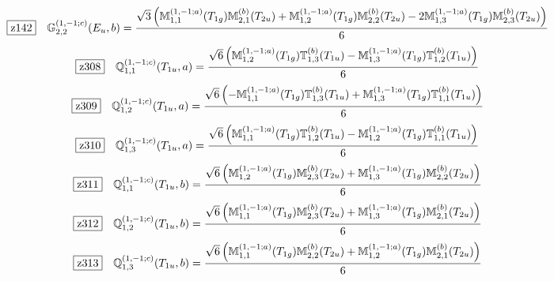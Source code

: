 \documentclass[fleqn,10pt,landscape]{jsarticle}
\begin{document}
\begin{dmath*}
\hspace*{3mm}\fbox{z142}\quad \mathbb{G}_{2,2}^{(1,-1;c)}(E_{u},b)=\frac{\sqrt{3} \left(\mathbb{M}_{1,1}^{(1,-1;a)}(T_{1g}) \mathbb{M}_{2,1}^{(b)}(T_{2u}) + \mathbb{M}_{1,2}^{(1,-1;a)}(T_{1g}) \mathbb{M}_{2,2}^{(b)}(T_{2u}) - 2 \mathbb{M}_{1,3}^{(1,-1;a)}(T_{1g}) \mathbb{M}_{2,3}^{(b)}(T_{2u})\right)}{6}
\end{dmath*}
\begin{dmath*}
\hspace*{3mm}\fbox{z308}\quad \mathbb{Q}_{1,1}^{(1,-1;c)}(T_{1u},a)=\frac{\sqrt{6} \left(\mathbb{M}_{1,2}^{(1,-1;a)}(T_{1g}) \mathbb{T}_{1,3}^{(b)}(T_{1u}) - \mathbb{M}_{1,3}^{(1,-1;a)}(T_{1g}) \mathbb{T}_{1,2}^{(b)}(T_{1u})\right)}{6}
\end{dmath*}
\begin{dmath*}
\hspace*{3mm}\fbox{z309}\quad \mathbb{Q}_{1,2}^{(1,-1;c)}(T_{1u},a)=\frac{\sqrt{6} \left(- \mathbb{M}_{1,1}^{(1,-1;a)}(T_{1g}) \mathbb{T}_{1,3}^{(b)}(T_{1u}) + \mathbb{M}_{1,3}^{(1,-1;a)}(T_{1g}) \mathbb{T}_{1,1}^{(b)}(T_{1u})\right)}{6}
\end{dmath*}
\begin{dmath*}
\hspace*{3mm}\fbox{z310}\quad \mathbb{Q}_{1,3}^{(1,-1;c)}(T_{1u},a)=\frac{\sqrt{6} \left(\mathbb{M}_{1,1}^{(1,-1;a)}(T_{1g}) \mathbb{T}_{1,2}^{(b)}(T_{1u}) - \mathbb{M}_{1,2}^{(1,-1;a)}(T_{1g}) \mathbb{T}_{1,1}^{(b)}(T_{1u})\right)}{6}
\end{dmath*}
\begin{dmath*}
\hspace*{3mm}\fbox{z311}\quad \mathbb{Q}_{1,1}^{(1,-1;c)}(T_{1u},b)=\frac{\sqrt{6} \left(\mathbb{M}_{1,2}^{(1,-1;a)}(T_{1g}) \mathbb{M}_{2,3}^{(b)}(T_{2u}) + \mathbb{M}_{1,3}^{(1,-1;a)}(T_{1g}) \mathbb{M}_{2,2}^{(b)}(T_{2u})\right)}{6}
\end{dmath*}
\begin{dmath*}
\hspace*{3mm}\fbox{z312}\quad \mathbb{Q}_{1,2}^{(1,-1;c)}(T_{1u},b)=\frac{\sqrt{6} \left(\mathbb{M}_{1,1}^{(1,-1;a)}(T_{1g}) \mathbb{M}_{2,3}^{(b)}(T_{2u}) + \mathbb{M}_{1,3}^{(1,-1;a)}(T_{1g}) \mathbb{M}_{2,1}^{(b)}(T_{2u})\right)}{6}
\end{dmath*}
\begin{dmath*}
\hspace*{3mm}\fbox{z313}\quad \mathbb{Q}_{1,3}^{(1,-1;c)}(T_{1u},b)=\frac{\sqrt{6} \left(\mathbb{M}_{1,1}^{(1,-1;a)}(T_{1g}) \mathbb{M}_{2,2}^{(b)}(T_{2u}) + \mathbb{M}_{1,2}^{(1,-1;a)}(T_{1g}) \mathbb{M}_{2,1}^{(b)}(T_{2u})\right)}{6}
\end{dmath*}
\end{document}
